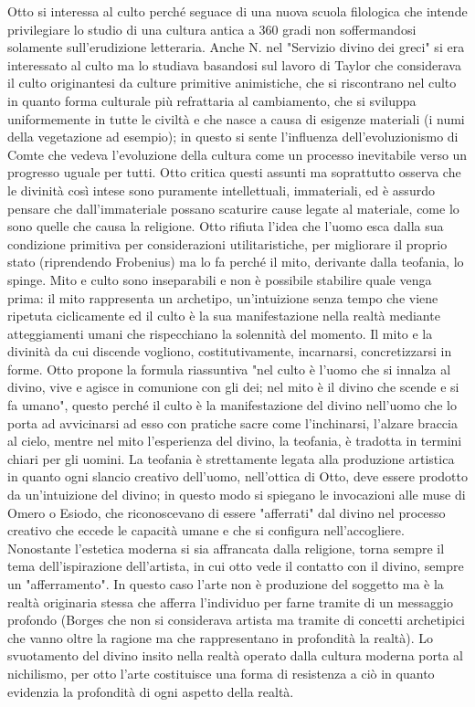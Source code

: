 \documentclass[10pt,a4paper]{article}
\begin{document}
Otto si interessa al culto perché seguace di una nuova scuola filologica che intende privilegiare lo studio di una cultura antica a 360 gradi non soffermandosi solamente sull'erudizione letteraria. Anche N. nel "Servizio divino dei greci" si era interessato al culto ma lo studiava basandosi sul lavoro di Taylor che considerava il culto originantesi da culture primitive animistiche, che si riscontrano nel culto in quanto forma culturale più refrattaria al cambiamento, che si sviluppa uniformemente in tutte le civiltà e che nasce a causa di esigenze materiali (i numi della vegetazione ad esempio); in questo si sente l'influenza dell'evoluzionismo di Comte che vedeva l'evoluzione della cultura come un processo inevitabile verso un progresso uguale per tutti. Otto critica questi assunti ma soprattutto osserva che le divinità così intese sono puramente intellettuali, immateriali, ed è assurdo pensare che dall'immateriale possano scaturire cause legate al materiale, come lo sono quelle che causa la religione. Otto rifiuta l'idea che l'uomo esca dalla sua condizione primitiva per considerazioni utilitaristiche, per migliorare il proprio stato (riprendendo Frobenius) ma lo fa perché il mito, derivante dalla teofania, lo spinge. Mito e culto sono inseparabili e non è possibile stabilire quale venga prima: il mito rappresenta un archetipo, un'intuizione senza tempo che viene ripetuta ciclicamente ed il culto è la sua manifestazione nella realtà mediante atteggiamenti umani che rispecchiano la solennità del momento. Il mito e la divinità da cui discende vogliono, costitutivamente, incarnarsi, concretizzarsi in forme. Otto propone la formula riassuntiva "nel culto è l'uomo che si innalza al divino, vive e agisce in comunione con gli dei; nel mito è il divino che scende e si fa umano", questo perché il culto è la manifestazione del divino nell'uomo che lo porta ad avvicinarsi ad esso con pratiche sacre come l'inchinarsi, l'alzare braccia al cielo, mentre nel mito l'esperienza del divino, la teofania, è tradotta in termini chiari per gli uomini. La teofania è strettamente legata alla produzione artistica in quanto ogni slancio creativo dell'uomo, nell'ottica di Otto, deve essere prodotto da un'intuizione del divino; in questo modo si spiegano le invocazioni alle muse di Omero o Esiodo, che riconoscevano di essere "afferrati" dal divino nel processo creativo che eccede le capacità umane e che si configura nell'accogliere. Nonostante l'estetica moderna si sia affrancata dalla religione, torna sempre il tema dell'ispirazione dell'artista, in cui otto vede il contatto con il divino, sempre un "afferramento". In questo caso l'arte non è produzione del soggetto ma è la realtà originaria stessa che afferra l'individuo per farne tramite di un messaggio profondo (Borges che non si considerava artista ma tramite di concetti archetipici che vanno oltre la ragione ma che rappresentano in profondità la realtà). Lo svuotamento del divino insito nella realtà operato dalla cultura moderna porta al nichilismo, per otto l'arte costituisce una forma di resistenza a ciò in quanto evidenzia la profondità di ogni aspetto della realtà. 
\end{document}
